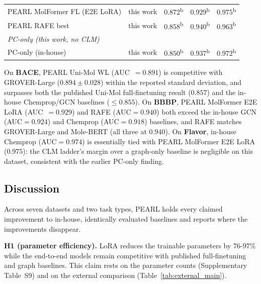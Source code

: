 \documentclass[pdflatex,sn-basic]{sn-jnl}%
\begin{document}
\begin{table}[!ht]
{\begin{tabular}{llccc}
PEARL MolFormer FL (E2E LoRA) & this work & $0.872$\textsuperscript{b}          & $0.929$\textsuperscript{b} & $\mathbf{0.975}$\textsuperscript{b} \\
PEARL RAFE best               & this work & $0.858$\textsuperscript{b}          & $\mathbf{0.940}$\textsuperscript{b}          & $0.963$\textsuperscript{b} \\
\midrule
\multicolumn{5}{l}{\textit{PC-only (this work, no CLM)}} \\[2pt]
PC-only (in-house)     & this work & $0.850$\textsuperscript{b}          & $0.937$\textsuperscript{b}          & $0.972$\textsuperscript{b} \\
\bottomrule
\end{tabular}
}
\end{table}

On \textbf{BACE}, PEARL Uni-Mol WL (AUC~$=0.891$) is competitive with GROVER-Large ($0.894\pm0.028$) within the reported standard deviation, and surpasses both the published Uni-Mol full-finetuning result ($0.857$) and the in-house Chemprop/GCN baselines ($\le0.855$). On \textbf{BBBP}, PEARL MolFormer E2E LoRA (AUC~$=0.929$) and RAFE (AUC$=0.940$) both exceed the in-house GCN (AUC$=0.924$) and Chemprop (AUC$=0.918$) baselines, and RAFE matches GROVER-Large and Mole-BERT (all three at $0.940$). On \textbf{Flavor}, in-house Chemprop (AUC$=0.974$) is essentially tied with PEARL MolFormer E2E LoRA ($0.975$): the CLM ladder's margin over a graph-only baseline is negligible on this dataset, consistent with the earlier PC-only finding.

\FloatBarrier
\subsection{Discussion}\label{sec:bace_discussion}
Across seven datasets and two task types, PEARL holds every claimed improvement to in-house, identically evaluated baselines and reports where the improvements disappear.

\textbf{H1 (parameter efficiency).} LoRA reduces the trainable parameters by $76$-$97\%$ while the end-to-end models remain competitive with published full-finetuning and graph baselines. This claim rests on the parameter counts (Supplementary Table~S9) and on the external comparison (Table~\ref{tab:external_main}).
\end{document}
